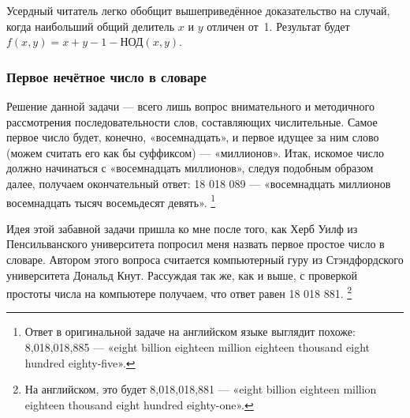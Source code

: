 Усердный читатель легко обобщит вышеприведённое доказательство на случай, 
когда наибольший общий делитель $x$ и $y$ отличен от~1.
Результат будет $f(x,y)=x+y-1-\text{НОД}(x,y)$.

\subsubsection*{Первое нечётное число в словаре}%

Решение данной задачи --- всего лишь вопрос внимательного и методичного рассмотрения последовательности слов, составляющих числительные.
Самое первое число будет, конечно, «восемнадцать», и первое идущее за ним слово (можем считать его как бы суффиксом) --- «миллионов».
Итак, искомое число должно начинаться с «восемнадцать миллионов», следуя подобным образом далее, получаем окончательный ответ: 18 018 089 --- «восемнадцать миллионов восемнадцать тысяч восемьдесят девять».%
\footnote{Ответ в оригинальной задаче на английском языке выглядит похоже: 8,018,018,885 --- «eight billion eighteen million eighteen thousand eight hundred eighty-five».}
\heart

Идея этой забавной задачи пришла ко мне после того, как Херб Уилф из Пенсильванского университета %
попросил меня назвать первое простое число в словаре.
Автором этого вопроса считается компьютерный гуру из Стэндфордского университета Дональд Кнут. %
Рассуждая так же, как и выше, с проверкой простоты числа на компьютере
получаем, что ответ равен 18 018 881.%
\footnote{На английском, это будет 8,018,018,881 --- «eight billion eighteen million eighteen thousand eight hundred eighty-one».}


